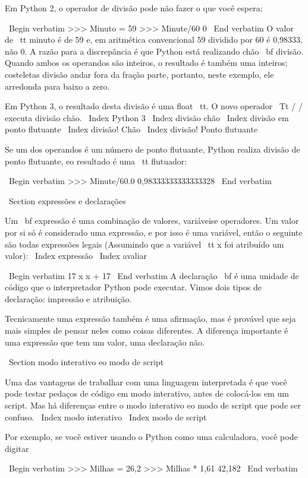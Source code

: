 \documentclass[10pt]{book}
\begin{document}
{Em Python 2, o operador de divisão pode não fazer o que você espera:

\ Begin {verbatim}
>>> Minuto = 59
>>> Minute/60
0
\ End {verbatim}
%
O valor de {\ tt minuto} é de 59 e, em aritmética convencional 59
dividido por 60 é 0,98333, não 0. A razão para a discrepância é
que Python está realizando {chão \ bf divisão}.
Quando ambos os operandos são inteiros, o resultado é também uma
inteiros; costeletas divisão andar fora da fração
parte, portanto, neste exemplo, ele arredonda para baixo a zero.

Em Python 3, o resultado desta divisão é uma {float \ tt}. O novo operador
{\ Tt / /} executa divisão chão.
\ Index {Python 3}
\ Index {divisão chão}
\ Index {divisão em ponto flutuante}
\ Index {divisão! Chão}
\ Index {divisão! Ponto flutuante}

Se um dos operandos é um número de ponto flutuante, Python realiza
divisão de ponto flutuante, eo resultado é uma {\ tt flutuador}:

\ Begin {verbatim}
>>> Minute/60.0
0,98333333333333328
\ End {verbatim}


\ Section {expressões e declarações}

Um {\ bf expressão} é uma combinação de valores, variáveis ​​e operadores.
Um valor por si só é considerado uma expressão, e por isso é
uma variável, então o seguinte são todas expressões legais
(Assumindo que a variável {\ tt x} foi atribuído um valor):
\ Index {expressão}
\ Index {avaliar}

\ Begin {verbatim}
17
x
x + 17
\ End {verbatim}
%
A declaração {\ bf} é uma unidade de código que o interpretador Python pode
executar. Vimos dois tipos de declaração: impressão e
atribuição.

Tecnicamente uma expressão também é uma afirmação, mas é provável que seja
mais simples de pensar neles como coisas diferentes. A diferença importante
é uma expressão que tem um valor, uma declaração não.


\ Section {modo interativo eo modo de script}

Uma das vantagens de trabalhar com uma linguagem interpretada é que
você pode testar pedaços de código em modo interativo, antes de colocá-los
em um script. Mas há diferenças entre o modo interativo
eo modo de script que pode ser confuso.
\ Index {modo interativo}
\ Index {modo de script}

Por exemplo, se você estiver usando o Python como uma calculadora, você pode digitar

\ Begin {verbatim}
>>> Milhas = 26,2
>>> Milhas * 1,61
42,182
\ End {verbatim}

}
\end{document}
